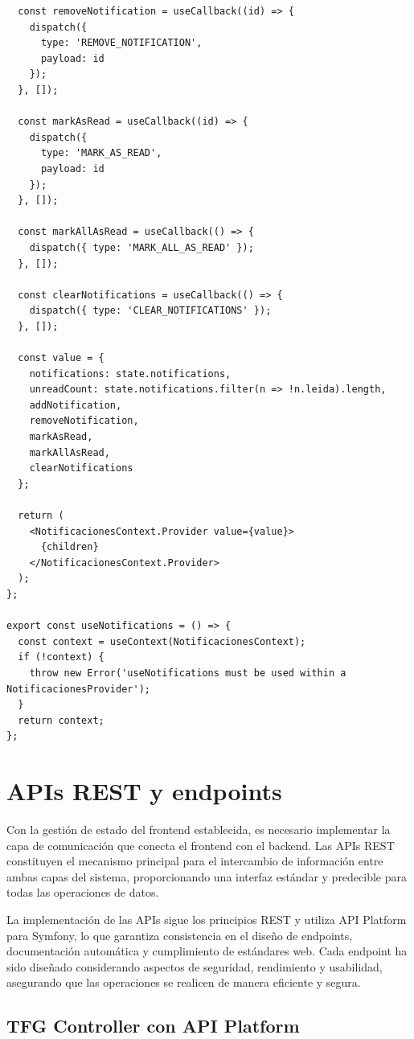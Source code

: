 \documentclass[12pt,a4paper,oneside]{report}
\begin{document}
\begin{lstlisting}
  const removeNotification = useCallback((id) => {
    dispatch({
      type: 'REMOVE_NOTIFICATION',
      payload: id
    });
  }, []);

  const markAsRead = useCallback((id) => {
    dispatch({
      type: 'MARK_AS_READ',
      payload: id
    });
  }, []);

  const markAllAsRead = useCallback(() => {
    dispatch({ type: 'MARK_ALL_AS_READ' });
  }, []);

  const clearNotifications = useCallback(() => {
    dispatch({ type: 'CLEAR_NOTIFICATIONS' });
  }, []);

  const value = {
    notifications: state.notifications,
    unreadCount: state.notifications.filter(n => !n.leida).length,
    addNotification,
    removeNotification,
    markAsRead,
    markAllAsRead,
    clearNotifications
  };

  return (
    <NotificacionesContext.Provider value={value}>
      {children}
    </NotificacionesContext.Provider>
  );
};

export const useNotifications = () => {
  const context = useContext(NotificacionesContext);
  if (!context) {
    throw new Error('useNotifications must be used within a NotificacionesProvider');
  }
  return context;
};
\end{lstlisting}

\section{APIs REST y endpoints}\label{apis-rest-y-endpoints}

Con la gestión de estado del frontend establecida, es necesario
implementar la capa de comunicación que conecta el frontend con el
backend. Las APIs REST constituyen el mecanismo principal para el
intercambio de información entre ambas capas del sistema, proporcionando
una interfaz estándar y predecible para todas las operaciones de datos.

La implementación de las APIs sigue los principios REST y utiliza API
Platform para Symfony, lo que garantiza consistencia en el diseño de
endpoints, documentación automática y cumplimiento de estándares web.
Cada endpoint ha sido diseñado considerando aspectos de seguridad,
rendimiento y usabilidad, asegurando que las operaciones se realicen de
manera eficiente y segura.

\subsection{TFG Controller con API
Platform}\label{tfg-controller-con-api-platform}
\end{document}
